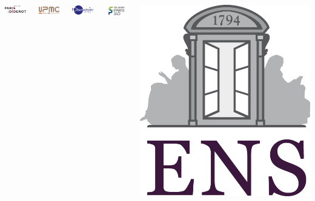 \begin{frame}
\titlepage
\centering
\begin{columns}
  \begin{column}{0.15\textwidth}
    \includegraphics[width=1.8cm]{titlepage/p7.jpg}
  \end{column}
  \begin{column}{0.15\textwidth}
    \includegraphics[width=1.8cm]{titlepage/upmc.png}
  \end{column}
  \begin{column}{0.15\textwidth}
    \includegraphics[width=1.8cm]{titlepage/obspm.png}
  \end{column}
  \begin{column}{0.15\textwidth}
    \includegraphics[width=1.8cm]{titlepage/psud.jpg}
  \end{column}
  \begin{column}{0.15\textwidth}
    \includegraphics[height=.9cm]{titlepage/ens.png}
  \end{column}
\end{columns}
\end{frame}